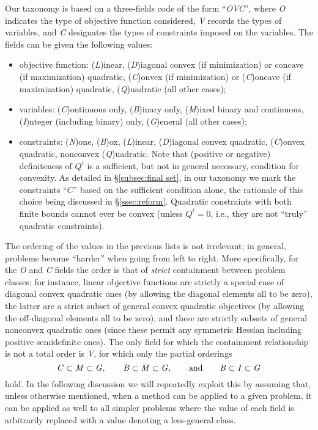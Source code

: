 Our taxonomy is based on a three-fields code of the form ``\textit{OVC}'', where \textit{O} indicates the type of objective function considered, \textit{V} records the types of variables, and \textit{C} designates the types of constraints imposed on the variables. The fields can be given the following values:
%
\begin{itemize}
 \item objective function: (\textit{L})inear, (\textit{D})iagonal convex (if minimization) or concave (if maximization) quadratic, (\textit{C})onvex (if minimization) or (\textit{C})oncave (if maximization) quadratic,  (\textit{Q})uadratic (all other cases);
 \item variables: (\textit{C})ontinuous only, (\textit{B})inary only, (\textit{M})ixed binary and continuous, (\textit{I})nteger (including binary) only, (\textit{G})eneral (all other cases);
 \item constraints: (\textit{N})one, (\textit{B})ox, (\textit{L})inear, (\textit{D})iagonal convex quadratic, (\textit{C})on\-vex quadratic, nonconvex (\textit{Q})uadratic.
    {Note that (positive or negative) definiteness of $Q^i$ is a sufficient, but not in general necessary, condition for convexity. As detailed in \S\ref{subsec:final set}, in our taxonomy we mark the constraints ``$C$'' based on the sufficient condition alone, the rationale of this choice being discussed in \S\ref{ssec:reform}.}
  Quadratic constraints with both finite bounds cannot ever be convex (unless $Q^i = 0$, i.e., they are not ``truly'' quadratic constraints).
\end{itemize}

The ordering of the values in the previous lists is not irrelevant; in general, problems become ``harder'' when going from left to right. More specifically, for the \textit{O} and \textit{C} fields the order is that of \emph{strict} containment between problem classes: for instance, linear objective functions are strictly a special case of diagonal convex quadratic ones (by allowing the diagonal elements all to be zero), the latter are a strict subset of general convex quadratic objectives (by allowing the off-diagonal elements all to be zero), and these are strictly subsets of general nonconvex quadratic ones (since these permit any symmetric Hessian including positive semidefinite ones). The only field for which the containment relationship is not a total order is \textit{V}, for which only the partial orderings
\[
 \mbox{\textit{C}} \subset \mbox{\textit{M}} \subset \mbox{\textit{G}},
 \qquad
 \mbox{\textit{B}} \subset \mbox{\textit{M}} \subset \mbox{\textit{G}},
 \qquad
 \mbox{and}
 \qquad
 \mbox{\textit{B}} \subset \mbox{\textit{I}} \subset \mbox{\textit{G}}
\]
hold. In the following discussion we will repeatedly exploit this by assuming that, unless otherwise mentioned, when a method can be applied to a given problem, it can be applied as well to all simpler problems where the value of each field is arbitrarily replaced with a value denoting a less-general class.

